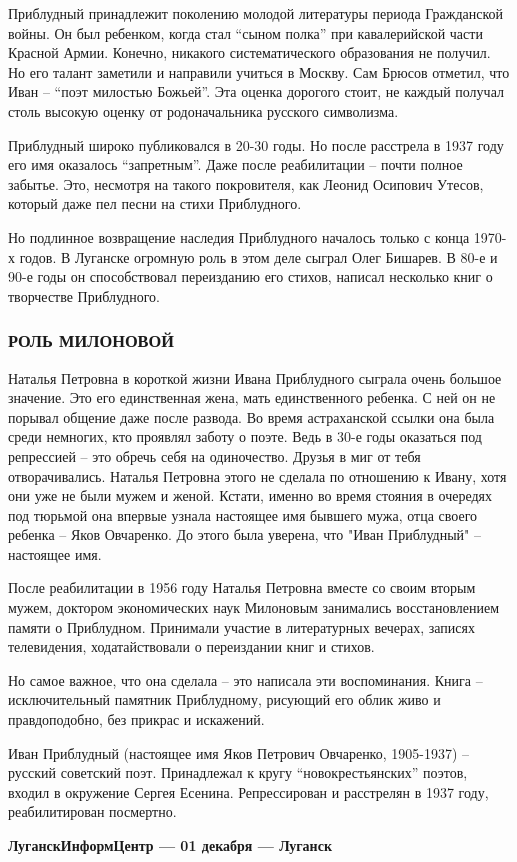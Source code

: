 Приблудный принадлежит поколению молодой литературы периода Гражданской войны.
Он был ребенком, когда стал \enquote{сыном полка} при кавалерийской части Красной
Армии. Конечно, никакого систематического образования не получил. Но его талант
заметили и направили учиться в Москву. Сам Брюсов отметил, что Иван – \enquote{поэт
милостью Божьей}. Эта оценка дорогого стоит, не каждый получал столь высокую
оценку от родоначальника русского символизма.

Приблудный широко публиковался в 20-30 годы. Но после расстрела в 1937 году его
имя оказалось \enquote{запретным}. Даже после реабилитации – почти полное забытье. Это,
несмотря на такого покровителя, как Леонид Осипович Утесов, который даже пел
песни на стихи Приблудного.

Но подлинное возвращение наследия Приблудного началось только с конца 1970-х
годов. В Луганске огромную роль в этом деле сыграл Олег Бишарев. В 80-е и 90-е
годы он способствовал переизданию его стихов, написал несколько книг о
творчестве Приблудного.

\subsubsection{РОЛЬ МИЛОНОВОЙ}

Наталья Петровна в короткой жизни Ивана Приблудного сыграла очень большое
значение. Это его единственная жена, мать единственного ребенка. С ней он не
порывал общение даже после развода. Во время астраханской ссылки она была среди
немногих, кто проявлял заботу о поэте. Ведь в 30-е годы оказаться под
репрессией – это обречь себя на одиночество. Друзья в миг от тебя
отворачивались. Наталья Петровна этого не сделала по отношению к Ивану, хотя
они уже не были мужем и женой. Кстати, именно во время стояния в очередях под
тюрьмой она впервые узнала настоящее имя бывшего мужа, отца своего ребенка –
Яков Овчаренко. До этого была уверена, что "Иван Приблудный" – настоящее имя.

После реабилитации в 1956 году Наталья Петровна вместе со своим вторым мужем,
доктором экономических наук Милоновым занимались восстановлением памяти о
Приблудном. Принимали участие в литературных вечерах, записях телевидения,
ходатайствовали о переиздании книг и стихов.

Но самое важное, что она сделала – это написала эти воспоминания. Книга –
исключительный памятник Приблудному, рисующий его облик живо и правдоподобно,
без прикрас и искажений.

Иван Приблудный (настоящее имя Яков Петрович Овчаренко, 1905-1937) – русский
советский поэт. Принадлежал к кругу \enquote{новокрестьянских} поэтов, входил в
окружение Сергея Есенина. Репрессирован и расстрелян в 1937 году,
реабилитирован посмертно. 

\textbf{ЛуганскИнформЦентр — 01 декабря — Луганск}

